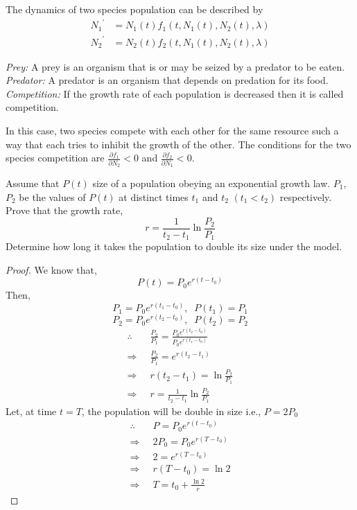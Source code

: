 \documentclass[../main-sheet.tex]{subfiles}
\begin{document}
\begin{soln}
    The dynamics of two species population can be described by
    \begin{align*}
        {N_1}^{'}&=N_1(t)f_1(t,N_1(t),N_2(t),\lambda)\\
        {N_2}^{'}&=N_2(t)f_2(t,N_1(t),N_2(t),\lambda)
    \end{align*}


    \emph{Prey:} A prey is an organism that is or may be seized by a predator to be eaten.\\

    \emph{Predator:} A predator is an organism that depends on predation for its food.\\

    \emph{Competition:} If the growth rate of each population is decreased then it is called competition.

    In this case, two species compete with each other for the same resource such a way that each tries to inhibit the growth of the other. The conditions for the two species competition are \(\frac{\partial f_1}{\partial N_2}<0\) and \(\frac{\partial f_2}{\partial N_1}<0\).
\end{soln}
\begin{prob}
    Assume that \(P(t)\) size of a population obeying an exponential growth law. \(P_1\), \(P_2\) be the values of \(P(t)\) at distinct times \(t_1\) and \(t_2\) \((t_1<t_2)\) respectively. Prove that the growth rate,
    \[r=\frac{1}{t_2-t_1}\ln\frac{P_2}{P_1}
    \]
    Determine how long it takes the population to double its size under the model.
\end{prob}
\begin{proof}
    We know that,
    \[P(t)=P_0e^{r(t-t_0)}\]
    Then, 
    \[
        P_1=P_0e^{r(t_1-t_0)}, \;\;P(t_1)=P_1
    \]
    \[
        P_2=P_0e^{r(t_2-t_0)}, \;\;P(t_2)=P_2
    \]
    \begin{align*}
        \therefore\;\;&\frac{P_2}{P_1}=\frac{P_0e^{r(t_2-t_0)}}{P_0e^{r(t_1-t_0)}}\\
        \Rightarrow\;\;&\frac{P_2}{P_1}=e^{r(t_2-t_1)}\\
        \Rightarrow\;\;&r(t_2-t_1)=\ln\frac{P_2}{P_1}\\
        \Rightarrow\;\;&r=\frac{1}{t_2-t_1}\ln\frac{P_2}{P_1}
    \end{align*}
    Let, at time \(t=T\), the population will be double in size i.e., \(P=2P_0\)
    \begin{align*}
        \therefore\;\;&P=P_0e^{r(t-t_0)}\\
        \Rightarrow\;\;&2P_0=P_0e^{r(T-t_0)}\\
        \Rightarrow\;\;&2=e^{r(T-t_0)}\\
        \Rightarrow\;\;&{r(T-t_0)}=\ln 2\\
        \Rightarrow\;\;&T=t_0+\frac{\ln 2}{r}
    \end{align*}
\end{proof}
\end{document}
